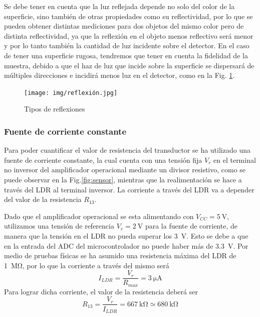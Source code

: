 \documentclass[12pt,a4paper,twoside,fleqn]{article}
\begin{document}
Se debe tener en cuenta que la luz reflejada depende no solo del color de la superficie, sino también de otras propiedades como su reflectividad\cite{avago_rgb_color_sensing}, por lo que se pueden obtener distintas mediciones para dos objetos del mismo color pero de distinta reflectividad, ya que la reflexión en el objeto menos reflectivo será menor y por lo tanto también la cantidad de luz incidente sobre el detector.
En el caso de tener una superficie rugosa, tendremos que tener en cuenta la fidelidad de la muestra, debido a que el haz de luz que incide sobre la superficie se dispersará de múltiples direcciones e incidirá menos luz en el detector, como en la Fig. \ref{fig:reflexión}.

\begin{figure}
    \centering
    \texttt{[image: img/reflexión.jpg]}
    \caption{Tipos de reflexiones}
    \label{fig:reflexión}
\end{figure}

\subsubsection*{Fuente de corriente constante}
Para poder cuantificar el valor de resistencia del transductor se ha utilizado una fuente de corriente constante, la cual cuenta con una tensión fija $V_r$ en el terminal no inversor del amplificador operacional mediante un divisor resistivo, como se puede observar en la Fig.\ref{fig:sensor}, mientras que la realimentación se hace a través del LDR al terminal inversor. La corriente a través del LDR va a depender del valor de la resistencia $R_{13}$.

Dado que el amplificador operacional se esta alimentando con $V_{CC}=\qty{5}{\V}$, utilizamos una tensión de referencia $V_r=\qty{2}{\V}$ para la fuente de corriente, de manera que la tensión en el LDR no pueda superar los \qty{3}{\V}. Esto se debe a que en la entrada del ADC del microcontrolador  no puede haber más de \qty{3.3}{\V}.
Por medio de pruebas físicas se ha asumido una resistencia máxima del LDR de \qty{1}{\Mohm}, por lo que la corriente a través del mismo será
\begin{equation*}
    I_{LDR} = \frac{V_r}{R_{max}} = \qty{3}{\uA}
\end{equation*}
Para lograr dicha corriente, el valor de la resistencia deberá ser
\begin{equation}
    R_{13} = \frac{V_r}{I_{LDR}} = \qty{667}{\kohm} \simeq \qty{680}{\kohm}
\end{equation}
\end{document}
